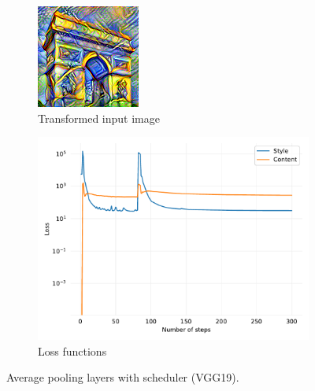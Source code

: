 \documentclass[twocolumn,superscriptaddress,aps,floatfix,nofootinbib]{revtex4-1}
\begin{document}
    \begin{figure}[ht]
        \centering
        \begin{subfigure}[b]{0.22\textwidth}
            \centering
            \includegraphics[width=\textwidth]{resources/png/architecture/sun-trees-paris-avgpool-scheduler.png}
            \caption{Transformed input image}
        \end{subfigure}
        \hfill
        \begin{subfigure}[b]{0.22\textwidth}
            \centering
            \includegraphics[width=\textwidth]{resources/pdf/architecture/sun-trees-paris-avgpool-scheduler.pdf}
            \caption{Loss functions}
        \end{subfigure}
        \caption{Average pooling layers with scheduler (VGG19).}
        \label{fig:model.architecture.loss.scheduler}
    \end{figure}
    
\end{document}
